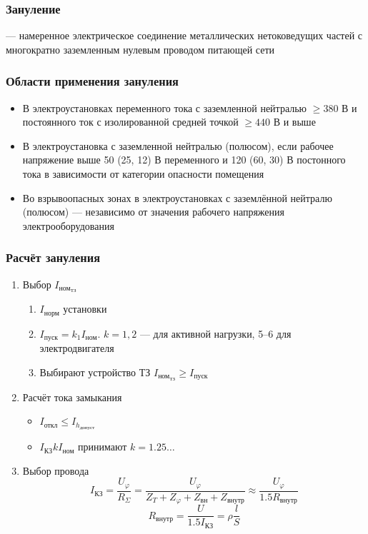 \documentclass[a4paper, 14pt]{extarticle}
\begin{document}
\FloatBarrier{}
\subsubsection{Зануление}
 --- намеренное электрическое соединение металлических нетоковедущих частей с многократно заземленным нулевым проводом питающей сети 

\subsubsection*{Области применения зануления}
\begin{itemize}
    \item В электроустановках переменного тока с заземленной нейтралью $ \ge 380 $ В и постоянного ток с изолированной средней точкой $ \ge 440 $ В и выше
    \item В электроустановка с заземленной нейтралью (полюсом), если рабочее напряжение выше 50 (25, 12) В переменного и 120 (60, 30) В постонного тока в зависимости от категории опасности помещения
    \item Во взрывоопасных зонах в электроустановках с заземлённой нейтралю (полюсом) --- независимо от значения рабочего напряжения электрооборудования
\end{itemize}

\subsubsection*{Расчёт зануления}
\begin{enumerate}
    \item Выбор $I_{\text{ном}_{\text{ТЗ}}}$
        \begin{enumerate}
            \item $ I_{\text{норм}} $ установки
            \item $ I_{\text{пуск}} = k_1 I_{\text{ном}} $. $k=1,2$ --- для активной нагрузки, 5--6 для электродвигателя
            \item Выбирают устройство ТЗ $ I_{\text{ном}_{\text{ТЗ}}} \ge I_{\text{пуск}} $
        \end{enumerate}
    \item Расчёт тока замыкания
    \begin{itemize}
        \item $ I_{\text{откл}} \le I_{h_{\text{допуст}}} $
        \item $I_{\text{КЗ}} k I_{\text{ном}}$ принимают $k=1.25 \ldots$
    \end{itemize}
    \item Выбор провода
        \[ I_{\text{КЗ}} = \frac{U_\varphi}{R_{ \Sigma }} = \frac{U_\varphi}{ Z_T + Z_\varphi + Z_{\text{вн}} + Z_{\text{внутр}} } \approx \frac{U_\varphi}{1.5 R_{\text{внутр}}}   \] 
        \[ R_{\text{внутр}} = \frac{U}{1.5 I_{\text{КЗ}}} = \rho \frac{l}{S}   \]
        
\end{enumerate}
\end{document}
